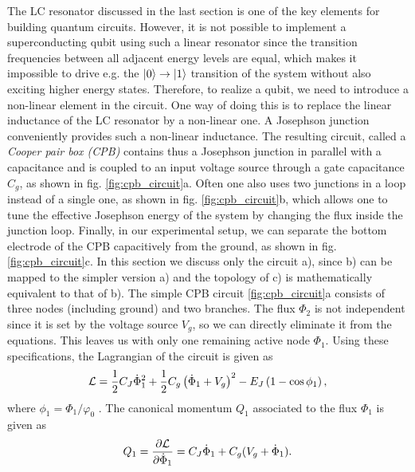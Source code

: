 The LC resonator discussed in the last section is one of the key elements for building quantum circuits. However, it is not possible to implement a superconducting qubit using such a linear resonator since the transition frequencies between all adjacent energy levels are equal, which makes it impossible to drive e.g. the $\left| 0 \right>\to\left| 1 \right>$ transition of the system without also exciting higher energy states. Therefore, to realize a qubit, we need to introduce a non-linear element in the circuit. One way of doing this is to replace the linear inductance of the LC resonator by a non-linear one. A Josephson junction conveniently provides such a non-linear inductance. The resulting circuit, called a {\it Cooper pair box (CPB)} contains thus a Josephson junction in parallel with a capacitance and is coupled to an input voltage source through a gate capacitance $C_g$, as shown in fig. \ref{fig:cpb_circuit}a. Often one also uses two junctions in a loop instead of a single one, as shown in fig. \ref{fig:cpb_circuit}b, which allows one to tune the effective Josephson energy of the system by changing the flux inside the junction loop. Finally, in our experimental setup, we can separate the bottom electrode of the CPB capacitively from the ground, as shown in fig. \ref{fig:cpb_circuit}c. In this section we discuss only the circuit a), since b) can be mapped to the simpler version a) and the topology of c) is mathematically equivalent to that of b). The simple CPB circuit \ref{fig:cpb_circuit}a consists of  three nodes (including ground) and two branches. The flux $\Phi_2$ is not independent since it is set by the voltage source $V_g$, so we can directly eliminate it from the equations. This leaves us with only one remaining active node $\Phi_1$. Using these specifications, the Lagrangian of the circuit is given as
%
\begin{equation}
\begin{mathcal}L\end{mathcal}=\frac{1}{2}C_J\dot{\Phi}_1^2+\frac{1}{2}C_g\left(\dot{\Phi}_1+V_g\right)^2-E_J\left(1-\cos{\phi_1}\right),
\end{equation}
%
where $\phi_1=\Phi_1/\varphi_0$ . The canonical momentum $Q_1$ associated to the flux $\Phi_1$ is given as
%
\begin{equation}
Q_1 = \frac{\partial \begin{mathcal}L\end{mathcal}}{\partial \dot{\Phi}_1} = C_J \dot{\Phi}_1+C_g(V_g+\dot{\Phi}_1). \label{eq:q_of_phi}
\end{equation}
